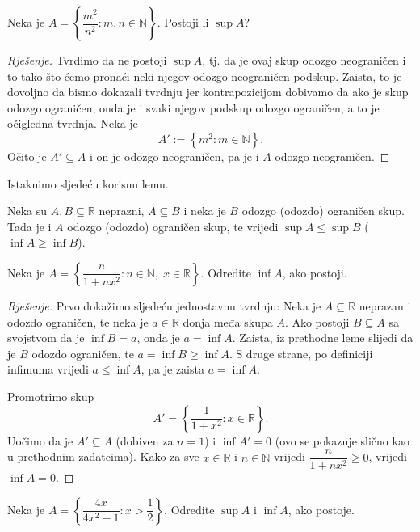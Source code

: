 \begin{exercise}
Neka je $A=\left\{\dfrac{m^2}{n^2} : m, n\in \mathbb{N}\right\}$. Postoji li $\sup{A}$?
\end{exercise}
\begin{proof}[Rješenje]
Tvrdimo da ne postoji $\sup{A}$, tj. da je ovaj skup odozgo neograničen i to tako što ćemo pronaći neki njegov odozgo neograničen podskup. Zaista, to je dovoljno da bismo dokazali tvrdnju jer kontrapozicijom dobivamo da ako je skup odozgo ograničen, onda je i svaki njegov podskup odozgo ograničen, a to je očigledna tvrdnja. Neka je $$A':=\left\{m^2 : m\in \mathbb{N}\right\}.$$ Očito je $A'\subseteq A$ i on je odozgo neograničen, pa je i $A$ odozgo neograničen.
\end{proof}
Istaknimo sljedeću korisnu lemu.
\begin{lemma}
Neka su $A, B\subseteq \mathbb{R}$ neprazni, $A\subseteq B$ i neka je $B$ odozgo (odozdo) ograničen skup. Tada je i $A$ odozgo (odozdo) ograničen skup, te vrijedi $\sup{A}\leq \sup{B}$ ($\inf{A}\geq \inf{B}$).
\end{lemma}
\begin{exercise}
Neka je $A=\left\{\dfrac{n}{1+nx^2} : n\in \mathbb{N},\; x\in \mathbb{R}\right\}$. Odredite $\inf{A}$, ako postoji.
\end{exercise}
\begin{proof}[Rješenje]
Prvo dokažimo sljedeću jednostavnu tvrdnju: Neka je $A\subseteq \mathbb{R}$ neprazan i odozdo ograničen, te neka je $a\in \mathbb{R}$ donja međa skupa $A$. Ako postoji $B\subseteq A$ sa svojstvom da je $\inf{B}=a$, onda je $a=\inf{A}$. Zaista, iz prethodne leme slijedi da je $B$ odozdo ograničen, te $a=\inf{B}\geq \inf{A}$. S druge strane, po definiciji infimuma vrijedi $a\leq \inf{A}$, pa je zaista $a=\inf{A}$.

Promotrimo skup
$$A'=\left\{\dfrac{1}{1+x^2} : x\in \mathbb{R}\right\}.$$
Uočimo da je $A'\subseteq A$ (dobiven za $n=1$) i $\inf{A'}=0$ (ovo se pokazuje slično kao u prethodnim zadatcima). Kako za sve $x\in \mathbb{R}$ i $n\in \mathbb{N}$ vrijedi $\dfrac{n}{1+nx^2}\geq 0$, vrijedi $\inf{A}=0$.
\end{proof}
\begin{exercise}
Neka je $A=\left\{\dfrac{4x}{4x^2-1} : x>\dfrac{1}{2}\right\}$. Odredite $\sup{A}$ i $\inf{A}$, ako postoje.
\end{exercise}
